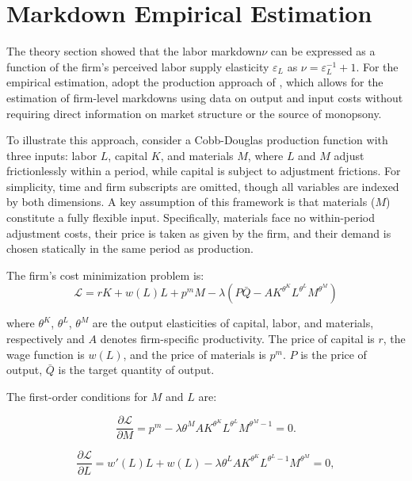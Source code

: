 \documentclass[12pt]{article}
\begin{document}
\section{Markdown Empirical Estimation}

The theory section showed that the labor markdown$\nu$ can be expressed as a function of the firm's perceived labor supply elasticity $\varepsilon_L$ as $\nu = \varepsilon_L^{-1} + 1$. For the empirical estimation, \textcite{yeh_monopsony_2022} adopt the production approach of \textcite{de_loecker_rise_2020}, which allows for the estimation of firm-level markdowns using data on output and input costs without requiring direct information on market structure or the source of monopsony.

To illustrate this approach, consider a Cobb-Douglas production function with three inputs: labor $L$, capital $K$, and materials $M$, where $L$ and $M$ adjust frictionlessly within a period, while capital is subject to adjustment frictions. For simplicity, time and firm subscripts are omitted, though all variables are indexed by both dimensions. A key assumption of this framework is that materials ($M$) constitute a fully flexible input. Specifically, materials face no within-period adjustment costs, their price is taken as given by the firm, and their demand is chosen statically in the same period as production.

The firm's cost minimization problem is:
%
\begin{equation}
    \mathcal{L} = rK + w(L)L + p^m M 
    - \lambda \left( P\bar{Q} - 
    A K^{\theta^K}L^{\theta^L}M^{\theta^M} \right)
\end{equation}
%

where $\theta^K$, $\theta^L$, $\theta^M$ are the output elasticities of capital, labor, and materials, respectively and $A$ denotes firm-specific productivity. The price of capital is $r$, the wage function is $w(L)$, and the price of materials is $p^m$. $P$ is the price of output, $\bar{Q}$ is the target quantity of output.

The first-order conditions for $M$ and $L$ are:

\begin{equation}
\frac{\partial \mathcal{L}}{\partial M} = p^m - \lambda \theta^M AK^{\theta^K}L^{\theta^L}M^{\theta^M-1}=0.
\end{equation}

\begin{equation}
\frac{\partial \mathcal{L}}{\partial L} = w'(L)L + w(L) - \lambda \theta^L AK^{\theta^K}L^{\theta^L-1}M^{\theta^M}=0,
\end{equation}
\end{document}
